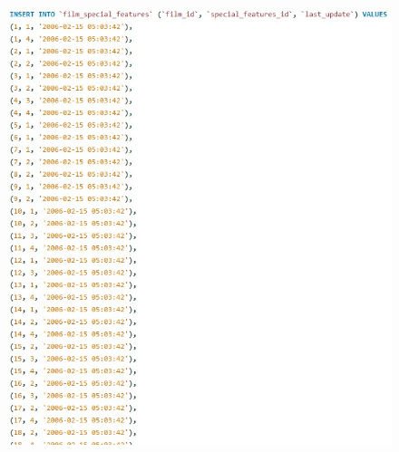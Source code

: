 \documentclass{article}
\begin{document}
		\begin{figure}[H]
			\includegraphics[width=\textwidth]{filmspecialfeatures1_insert_norm}

\end{figure}
\end{document}
